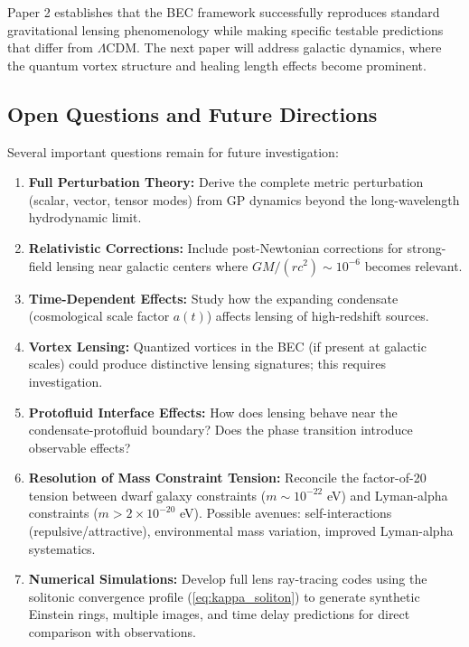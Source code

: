 \documentclass[11pt,a4paper]{article}
\theoremstyle{definition}
\theoremstyle{remark}
\begin{document}
Paper 2 establishes that the BEC framework successfully reproduces standard gravitational lensing phenomenology while making specific testable predictions that differ from $\Lambda$CDM. The next paper will address galactic dynamics, where the quantum vortex structure and healing length effects become prominent.

\subsection{Open Questions and Future Directions}
\label{sec:future_directions}

Several important questions remain for future investigation:

\begin{enumerate}[leftmargin=*, itemsep=0.3em]

\item \textbf{Full Perturbation Theory:} Derive the complete metric perturbation (scalar, vector, tensor modes) from GP dynamics beyond the long-wavelength hydrodynamic limit.

\item \textbf{Relativistic Corrections:} Include post-Newtonian corrections for strong-field lensing near galactic centers where $GM/(rc^2) \sim 10^{-6}$ becomes relevant.

\item \textbf{Time-Dependent Effects:} Study how the expanding condensate (cosmological scale factor $a(t)$) affects lensing of high-redshift sources.

\item \textbf{Vortex Lensing:} Quantized vortices in the BEC (if present at galactic scales) could produce distinctive lensing signatures; this requires investigation.

\item \textbf{Protofluid Interface Effects:} How does lensing behave near the condensate-protofluid boundary? Does the phase transition introduce observable effects?

\item \textbf{Resolution of Mass Constraint Tension:} Reconcile the factor-of-20 tension between dwarf galaxy constraints ($m \sim 10^{-22}$ eV) and Lyman-alpha constraints ($m > 2 \times 10^{-20}$ eV). Possible avenues: self-interactions (repulsive/attractive), environmental mass variation, improved Lyman-alpha systematics.

\item \textbf{Numerical Simulations:} Develop full lens ray-tracing codes using the solitonic convergence profile (\ref{eq:kappa_soliton}) to generate synthetic Einstein rings, multiple images, and time delay predictions for direct comparison with observations.

\end{enumerate}
\end{document}
